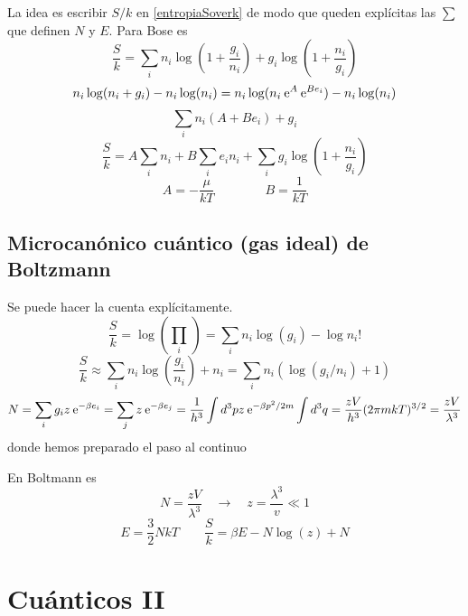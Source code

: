 \documentclass[10pt,oneside]{CBFT_book}
\begin{document}
La idea es escribir $ S / k $ en \eqref{entropiaSoverk} de modo que queden explícitas las
$\sum$ que definen $N$ y $E$. Para Bose es 
\[
	\frac{S}{k} = \sum_i n_i \log \left( 1 + \frac{g_i}{n_i} \right) + 
	g_i \log \left( 1 + \frac{n_i}{g_i} \right)
\]
\[
	n_i \log ( n_i + g_i ) - n_i \log ( n_i ) = 
	n_i \log ( n_i \:\mathrm{e}^{A} \:\mathrm{e}^{Be_i} ) - n_i \log ( n_i )
\]
\[
	\sum_i n_i (A + Be_i) + g_i
\]
\[
	\frac{S}{k} = A \sum_i n_i + B \sum_i e_i n_i + \sum_i g_i \log \left( 1 + \frac{n_i}{g_i} \right)
\]
\[
	A = - \frac{ \mu }{ k T } \qquad \qquad B = \frac{1}{ kT }
\]

\subsection{Microcanónico cuántico (gas ideal) de Boltzmann}

Se puede hacer la cuenta explícitamente.
\[
	\frac{S}{k} = \log \left( \prod_i \frac{}{} \right) =
	\sum_i n_i \log (g_i) - \log n_i!
\]
\[
	\frac{S}{k} \approx 	\sum_i n_i \log \left(\frac{g_i}{n_i}\right) + n_i =
	\sum_i n_i \left( \log (g_i/n_i) + 1 \right)
\]
\[
	N = \sum_i g_i z \:\mathrm{e}^{-\beta e_i} = \sum_j z\:\mathrm{e}^{-\beta e_j} =
	\frac{1}{h^3} \int d^3p z \:\mathrm{e}^{-\beta p^2 / 2m } \int d^3 q =
	\frac{zV}{h^3} (2\pi m k T)^{3/2} = \frac{zV}{\lambda^3}
\]
donde hemos preparado el paso al continuo

En Boltmann es 
\[
	N = \frac{zV}{\lambda^3} \quad \rightarrow \quad z = \frac{\lambda^3}{v} \ll 1 
\]
\[
	E = \frac{3}{2}NkT \qquad \frac{S}{k} = \beta E - N \log( z ) + N
\]


\section{Cuánticos II}
\end{document}
